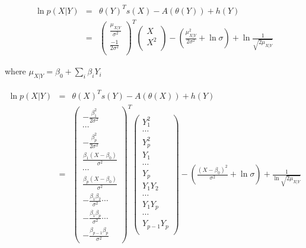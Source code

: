 \documentclass[11pt, oneside]{article}   	%
\numberwithin{figure}{section}
\numberwithin{equation}{section}
\numberwithin{table}{section}
\begin{document}
\begin{eqnarray*}
\ln p(X|Y) &=& \theta(Y)^T s(X) - A(\theta(Y)) + h(Y)\\
&=&
\begin{pmatrix}
\frac{\mu_{X|Y}}{\sigma^2}\\
\frac{-1}{2\sigma^2}\\
\end{pmatrix}^T
\begin{pmatrix}
X\\
X^2\\
\end{pmatrix}
- \left(\frac{\mu_{X|Y}^2}{2\sigma^2} + \ln{\sigma}\right) + \ln{\frac{1}{\sqrt{2\mu_{X|Y}}}} 
\end{eqnarray*}

where $\mu_{X|Y} = \beta_0+\sum_i{\beta_i Y_i}$

\begin{eqnarray*}
\ln p(X|Y) &=& \theta(X)^T s(Y) - A(\theta(X)) + h(Y)\\
&=&
\begin{pmatrix}
-\frac{\beta_1^2}{2\sigma^2}\\
\cdots\\
-\frac{\beta_p^2}{2\sigma^2}\\
\frac{\beta_1(X-\beta_0)}{\sigma^2}\\
\cdots\\
\frac{\beta_p(X-\beta_0)}{\sigma^2}\\
-\frac{\beta_1\beta_2}{\sigma^2}
\cdots\\
-\frac{\beta_1\beta_p}{\sigma^2}
\cdots\\
-\frac{\beta_{p-1}\beta_p}{\sigma^2}
\end{pmatrix}^T
\begin{pmatrix}
Y_1^2\\
\cdots\\
Y_p^2\\
Y_1\\
\cdots\\
Y_p\\
Y_1 Y_2\\
\cdots\\
Y_1 Y_p\\
\cdots\\
Y_{p-1}Y_{p}\\
\end{pmatrix}
- \left( \frac{(X-\beta_0)^2}{\sigma^2} + \ln{\sigma} \right) + \frac{1}{\ln{\sqrt{2\mu_{X|Y}}}}
\end{eqnarray*}
\end{document}
